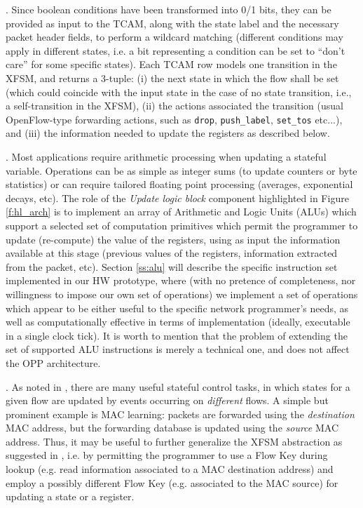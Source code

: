 \documentclass{sig-alternate}
\begin{document}
\vspace{3pt} . Since boolean conditions have been transformed into 0/1 bits, they can be provided as input to the TCAM, along with the state label and the necessary packet header fields, to perform a wildcard matching (different conditions may apply in different states, i.e. a bit representing a condition can be set to ``don't care'' for some specific states). Each TCAM row models one transition in the XFSM, and returns a 3-tuple: (i) the next state in which the flow shall be set (which could coincide with the input state in the case of no state transition, i.e., a self-transition in the XFSM), (ii) the actions associated the transition (usual OpenFlow-type forwarding actions, such as \texttt{drop}, \texttt{push\_label}, \texttt{set\_tos} etc...), and (iii) the information needed to update the registers as described below. 

\vspace{3pt} . Most applications require arithmetic processing when updating a stateful variable. Operations can be as simple as integer sums (to update counters or byte statistics) or can require tailored floating point processing (averages, exponential decays, etc). The role of the {\em Update logic block} component highlighted in Figure \ref{f:hl_arch} is to implement an array of Arithmetic and Logic Units (ALUs) which support a selected set of computation primitives which permit the programmer to update (re-compute) the value of the registers, using as input the information available at this stage (previous values of the registers, information extracted from the packet, etc). Section \ref{ss:alu} will describe the specific instruction set implemented in our HW prototype, where (with no pretence of completeness, nor willingness to impose our own set of operations) we implement a set of operations which appear to be either useful to the specific network programmer's needs, as well as computationally effective in terms of implementation (ideally, executable in a single clock tick). It is worth to mention that the problem of extending the set of supported ALU instructions is merely a technical one, and does not affect the OPP architecture.  

\vspace{3pt} . As noted in \cite{ccr14}, there are many useful stateful control tasks, in which states for a given flow are updated by events occurring on {\em different} flows. A simple but prominent example is MAC learning: packets are forwarded using the {\em destination} MAC address, but the forwarding database is updated using the {\em source} MAC address. Thus, it may be useful to further generalize the XFSM abstraction as suggested in \cite{ccr14}, i.e. by permitting the programmer to use a Flow Key during lookup (e.g. read information associated to a MAC destination address) and employ a possibly different Flow Key (e.g. associated to the MAC source) for updating a state or a register.
\end{document}
